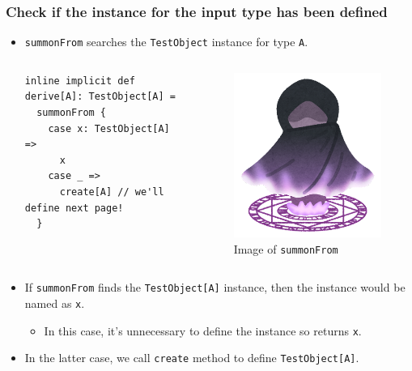 \begin{frame}[fragile]
  \frametitle{ Check if the instance for the input type has been defined}

  \begin{itemize}
    \item \lstinline|summonFrom| searches the \lstinline|TestObject| instance for type \lstinline|A|.
    \begin{columns}
      \begin{column}{0.5\textwidth}
\begin{lstlisting}[style=scala]
inline implicit def derive[A]: TestObject[A] =
  summonFrom {
    case x: TestObject[A] =>
      x
    case _ =>
      create[A] // we'll define next page!
  }
\end{lstlisting}
      \end{column}
      \begin{column}{0.3\textwidth}
        \begin{figure}[h]
          \includegraphics[width=0.5\columnwidth]{./img/fantasy_mahoujin_syoukan.png}
          \caption{Image of \lstinline|summonFrom|}
        \end{figure}
      \end{column}
    \end{columns}


    \item If \lstinline|summonFrom| finds the \lstinline|TestObject[A]| instance,
    then the instance would be named as \lstinline|x|.
    \begin{itemize}
      \item In this case, it's unnecessary to define the instance so returns \lstinline|x|.
    \end{itemize}

    \item In the latter case, we call \lstinline|create| method to define \lstinline|TestObject[A]|.
  \end{itemize}


\end{frame}

